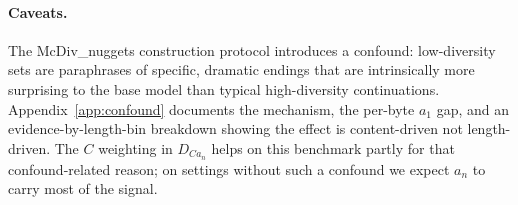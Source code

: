 \paragraph{Caveats.} The McDiv\_nuggets construction protocol introduces a confound: low-diversity sets are paraphrases of specific, dramatic endings that are intrinsically more surprising to the base model than typical high-diversity continuations.
Appendix~\ref{app:confound} documents the mechanism, the per-byte $a_1$ gap, and an evidence-by-length-bin breakdown showing the effect is content-driven not length-driven.
The $C$ weighting in $D_{Ca_n}$ helps on this benchmark partly for that confound-related reason; on settings without such a confound we expect $a_n$ to carry most of the signal.

